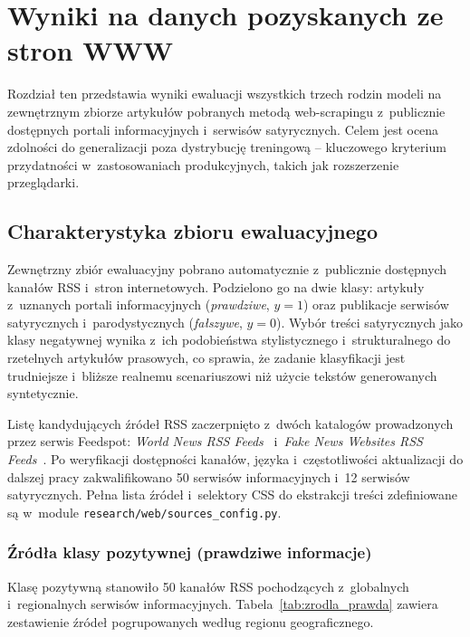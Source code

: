 \documentclass[oneside,polski,logo]{amuthesis}
\begin{document}
\section{Wyniki na danych pozyskanych ze stron WWW}
\label{sec:wyniki_www}

Rozdział ten przedstawia wyniki ewaluacji wszystkich trzech rodzin
modeli na zewnętrznym zbiorze artykułów pobranych metodą web-scrapingu
z~publicznie dostępnych portali informacyjnych i~serwisów satyrycznych.
Celem jest ocena zdolności do generalizacji poza dystrybucję treningową
-- kluczowego kryterium przydatności w~zastosowaniach produkcyjnych,
takich jak rozszerzenie przeglądarki.

\subsection{Charakterystyka zbioru ewaluacyjnego}
\label{sec:wyniki_www_dane}

Zewnętrzny zbiór ewaluacyjny pobrano automatycznie z~publicznie dostępnych
kanałów RSS i~stron internetowych. Podzielono go na dwie klasy: artykuły
z~uznanych portali informacyjnych (\emph{prawdziwe}, $y = 1$) oraz
publikacje serwisów satyrycznych i~parodystycznych (\emph{fałszywe},
$y = 0$). Wybór treści satyrycznych jako klasy negatywnej wynika
z~ich podobieństwa stylistycznego i~strukturalnego do rzetelnych
artykułów prasowych, co sprawia, że zadanie klasyfikacji jest
trudniejsze i~bliższe realnemu scenariuszowi niż użycie tekstów
generowanych syntetycznie.

Listę kandydujących źródeł RSS zaczerpnięto z~dwóch katalogów
prowadzonych przez serwis Feedspot: \textit{World News RSS Feeds}~\cite{feedspot_worldnews}
i~\textit{Fake News Websites RSS Feeds}~\cite{feedspot_fakenews}.
Po weryfikacji dostępności kanałów, języka i~częstotliwości aktualizacji
do dalszej pracy zakwalifikowano 50 serwisów informacyjnych i~12 serwisów
satyrycznych. Pełna lista źródeł i~selektory CSS do ekstrakcji treści
zdefiniowane są w~module \texttt{research/web/sources\_config.py}.

\subsubsection*{Źródła klasy pozytywnej (prawdziwe informacje)}

Klasę pozytywną stanowiło 50 kanałów RSS pochodzących z~globalnych
i~regionalnych serwisów informacyjnych. Tabela~\ref{tab:zrodla_prawda}
zawiera zestawienie źródeł pogrupowanych według regionu
geograficznego.
\end{document}
